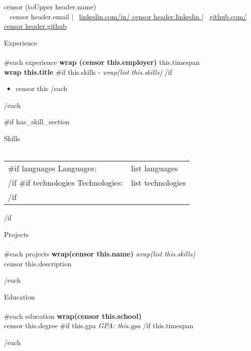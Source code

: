 \documentclass[letterpaper]{article}
\newcommand{\lineunder} {
    \vspace*{-8pt} \\
    \hspace*{-18pt} \hrulefill \\
}
\newcommand{\header} [1] {
    {\hspace*{-18pt}\vspace*{6pt} {#1}}
    \vspace*{-6pt} \lineunder
}
\begin{document}
\vspace*{-40pt}

\sffamily

\vspace*{-25pt}
\begin{center}
    {\Huge {{ censor (toUpper header.name) }}}\\
    \vspace{2.5pt}
    \faEnvelope \ {{ censor header.email }}
    $|$ \faLinkedinSquare \ \href{https://linkedin.com/in/{{ censorText header.linkedin }}}{linkedin.com/in/{{ censor header.linkedin }}}
    $|$ \faGithub \ \href{https://github.com/{{ censorText header.github }}}{github.com/{{ censor header.github }}}\\
\end{center}




\header{Experience}
\vspace{1mm}
{{#each experience }}
\textbf{{ wrap (censor this.employer) }}
\hfill {{ this.timespan }}\\
\textbf{{ wrap this.title }} {{#if this.skills }}- \textit{{ wrap(list this.skills) }}{{/if}}
\vspace{-1.75mm}
\begin{itemize}[leftmargin=10pt] \itemsep -1pt
{{#each this.bullets }}
    \item {{ censor this }}
{{/each}}
\end{itemize}

{{/each}}



{{#if has_skill_section }}
\header{Skills}
\vspace{1mm}
\begin{tabular}{ l l }
{{#if languages }}    Languages:    & {{ list languages }} \\ {{/if}}
{{#if technologies }}    Technologies: & {{ list technologies }} \\ {{/if}}
\end{tabular}
\vspace{2mm}
{{/if}}




\header{Projects}
\vspace{1mm}
{{#each projects }}
\textbf{{ wrap(censor this.name) }} \textit{{ wrap(list this.skills) }} \\
{{ censor this.description }} \\
\vspace*{2mm}

{{/each}}



\header{Education}
{{#each education }}
\textbf{{ wrap(censor this.school) }}
\hfill\\
{{ censor this.degree }}{{#if this.gpa }} \textit{GPA: {{ this.gpa }}}{{/if}}
\hfill {{ this.timespan }}\\
\vspace{2mm}

{{/each}}
\end{document}
